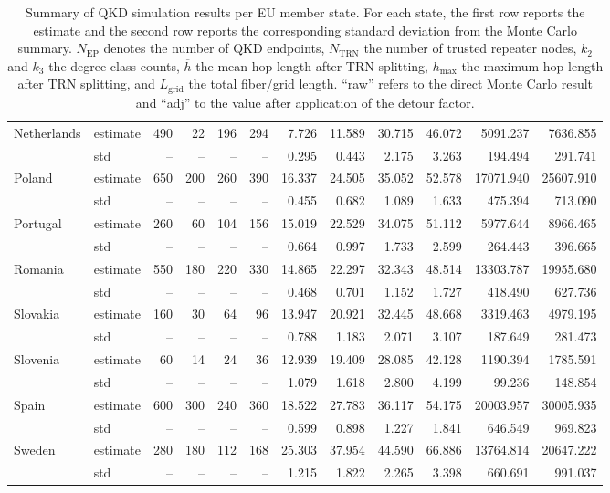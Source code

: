 \begin{table}[htbp]
\begin{tabular}{llrrrrrrrrrr}
\hline
Netherlands & estimate & 490 & 22 & 196 & 294 & 7.726 & 11.589 & 30.715 & 46.072 & 5091.237 & 7636.855 \\
 & std & -- & -- & -- & -- & 0.295 & 0.443 & 2.175 & 3.263 & 194.494 & 291.741 \\
\hline
Poland & estimate & 650 & 200 & 260 & 390 & 16.337 & 24.505 & 35.052 & 52.578 & 17071.940 & 25607.910 \\
 & std & -- & -- & -- & -- & 0.455 & 0.682 & 1.089 & 1.633 & 475.394 & 713.090 \\
\hline
Portugal & estimate & 260 & 60 & 104 & 156 & 15.019 & 22.529 & 34.075 & 51.112 & 5977.644 & 8966.465 \\
 & std & -- & -- & -- & -- & 0.664 & 0.997 & 1.733 & 2.599 & 264.443 & 396.665 \\
\hline
Romania & estimate & 550 & 180 & 220 & 330 & 14.865 & 22.297 & 32.343 & 48.514 & 13303.787 & 19955.680 \\
 & std & -- & -- & -- & -- & 0.468 & 0.701 & 1.152 & 1.727 & 418.490 & 627.736 \\
\hline
Slovakia & estimate & 160 & 30 & 64 & 96 & 13.947 & 20.921 & 32.445 & 48.668 & 3319.463 & 4979.195 \\
 & std & -- & -- & -- & -- & 0.788 & 1.183 & 2.071 & 3.107 & 187.649 & 281.473 \\
\hline
Slovenia & estimate & 60 & 14 & 24 & 36 & 12.939 & 19.409 & 28.085 & 42.128 & 1190.394 & 1785.591 \\
 & std & -- & -- & -- & -- & 1.079 & 1.618 & 2.800 & 4.199 & 99.236 & 148.854 \\
\hline
Spain & estimate & 600 & 300 & 240 & 360 & 18.522 & 27.783 & 36.117 & 54.175 & 20003.957 & 30005.935 \\
 & std & -- & -- & -- & -- & 0.599 & 0.898 & 1.227 & 1.841 & 646.549 & 969.823 \\
\hline
Sweden & estimate & 280 & 180 & 112 & 168 & 25.303 & 37.954 & 44.590 & 66.886 & 13764.814 & 20647.222 \\
 & std & -- & -- & -- & -- & 1.215 & 1.822 & 2.265 & 3.398 & 660.691 & 991.037 \\
\hline
\end{tabular}
\caption{Summary of QKD simulation results per EU member state. For each state, the first row reports the estimate and the second row reports the corresponding standard deviation from the Monte Carlo summary. $N_{\mathrm{EP}}$ denotes the number of QKD endpoints, $N_{\mathrm{TRN}}$ the number of trusted repeater nodes, $k_2$ and $k_3$ the degree-class counts, $\overline{h}$ the mean hop length after TRN splitting, $h_{\max}$ the maximum hop length after TRN splitting, and $L_{\mathrm{grid}}$ the total fiber/grid length. “raw” refers to the direct Monte Carlo result and “adj” to the value after application of the detour factor.}
\label{tab:eums_qkd_summary}
\end{table}
